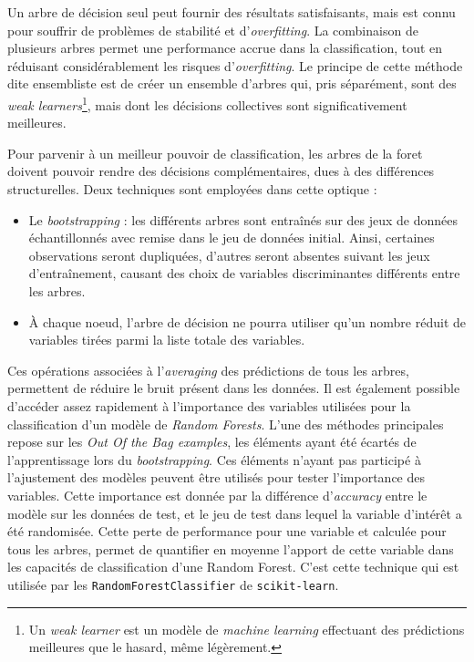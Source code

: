 \documentclass[french]{llncs}
\begin{document}
Un arbre de décision seul peut fournir des résultats satisfaisants, mais est connu pour souffrir de problèmes de stabilité et d'\textit{overfitting}. La combinaison de plusieurs arbres permet une performance accrue dans la classification, tout en réduisant considérablement les risques d'\textit{overfitting}. Le principe de cette méthode dite ensembliste est de créer un ensemble d'arbres qui, pris séparément, sont des \textit{weak learners}\footnote{Un \textit{weak learner} est un modèle de \textit{machine learning} effectuant des prédictions meilleures que le hasard, même légèrement.}, mais dont les décisions collectives sont significativement meilleures.

Pour parvenir à un meilleur pouvoir de classification, les arbres de la foret doivent pouvoir rendre des décisions complémentaires, dues à des différences structurelles. Deux techniques sont employées dans cette optique :

\begin{itemize}
    \item Le \textit{bootstrapping} : les différents arbres sont entraînés sur des jeux de données échantillonnés avec remise dans le jeu de données initial. Ainsi, certaines observations seront dupliquées, d'autres seront absentes suivant les jeux d'entraînement, causant des choix de variables discriminantes différents entre les arbres.
    
    \item À chaque noeud, l'arbre de décision ne pourra utiliser qu'un nombre réduit de variables tirées parmi la liste totale des variables.
\end{itemize}

Ces opérations associées à l'\textit{averaging} des prédictions de tous les arbres, permettent de réduire le bruit présent dans les données.
Il est également possible d'accéder assez rapidement à l'importance des variables utilisées pour la classification d'un modèle de \textit{Random Forests}. L'une des méthodes principales repose sur les \textit{Out Of the Bag examples}, les éléments ayant été écartés de l'apprentissage lors du \textit{bootstrapping}. Ces éléments n'ayant pas participé à l'ajustement des modèles peuvent être utilisés pour tester l'importance des variables. Cette importance est donnée par la différence d'\textit{accuracy} entre le modèle sur les données de test, et le jeu de test dans lequel la variable d'intérêt a été randomisée. Cette perte de performance pour une variable et calculée pour tous les arbres, permet de quantifier en moyenne l'apport de cette variable dans les capacités de classification d'une Random Forest.
C'est cette technique qui est utilisée par les \texttt{RandomForestClassifier} de \texttt{scikit-learn}. 
\end{document}
